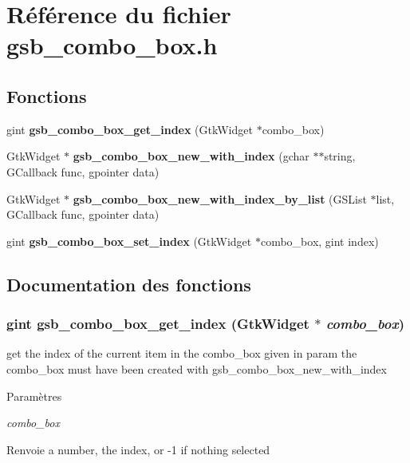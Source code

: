 \section{Référence du fichier gsb\_\-combo\_\-box.h}
\label{gsb__combo__box_8h}
\subsection*{Fonctions}
\begin{DoxyCompactItemize}
\item 
gint {\bf gsb\_\-combo\_\-box\_\-get\_\-index} (GtkWidget $\ast$combo\_\-box)
\item 
GtkWidget $\ast$ {\bf gsb\_\-combo\_\-box\_\-new\_\-with\_\-index} (gchar $\ast$$\ast$string, GCallback func, gpointer data)
\item 
GtkWidget $\ast$ {\bf gsb\_\-combo\_\-box\_\-new\_\-with\_\-index\_\-by\_\-list} (GSList $\ast$list, GCallback func, gpointer data)
\item 
gint {\bf gsb\_\-combo\_\-box\_\-set\_\-index} (GtkWidget $\ast$combo\_\-box, gint index)
\end{DoxyCompactItemize}


\subsection{Documentation des fonctions}
\subsubsection[{gsb\_\-combo\_\-box\_\-get\_\-index}]{\setlength{\rightskip}{0pt plus 5cm}gint gsb\_\-combo\_\-box\_\-get\_\-index (GtkWidget $\ast$ {\em combo\_\-box})}\label{gsb__combo__box_8h_a12d7d2e0baa0791bf2e5740c43376153}
get the index of the current item in the combo\_\-box given in param the combo\_\-box must have been created with gsb\_\-combo\_\-box\_\-new\_\-with\_\-index


\begin{DoxyParams}{Paramètres}
\item[{\em combo\_\-box}]\end{DoxyParams}
\begin{DoxyReturn}{Renvoie}
a number, the index, or -\/1 if nothing selected 
\end{DoxyReturn}


